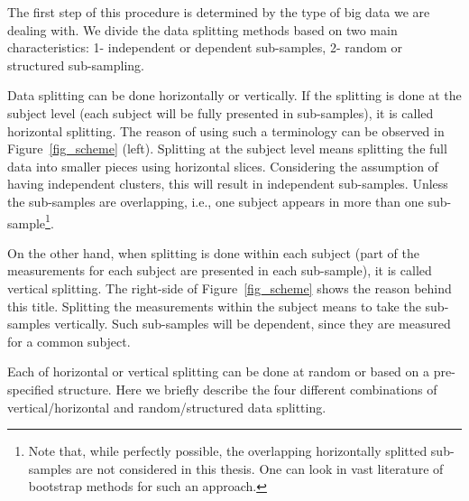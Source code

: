 \documentclass[14pt]{article}
\begin{document}
The first step of this procedure is determined by the type of big data we are dealing with. We divide the data splitting methods based on two main characteristics: 1- independent or dependent sub-samples, 2- random or structured sub-sampling.

Data splitting can be done horizontally or vertically. If the splitting is done at the subject level (each subject will be fully presented in sub-samples), it is called horizontal splitting. The reason of using such a terminology can be observed in Figure~\ref{fig_scheme} (left). Splitting at the subject level means splitting the full data into smaller pieces using horizontal slices. Considering the assumption of having independent clusters, this will result in independent sub-samples. Unless the sub-samples are overlapping, i.e., one subject appears in more than one sub-sample\footnote{Note that, while perfectly possible, the overlapping horizontally splitted sub-samples are not considered in this thesis. One can look in vast literature of bootstrap methods for such an approach.}.

On the other hand, when splitting is done within each subject (part of the measurements for each subject are presented in each sub-sample), it is called vertical splitting. The right-side of Figure~\ref{fig_scheme} shows the reason behind this title. Splitting the measurements within the subject means to take the sub-samples vertically. Such sub-samples will be dependent, since they are measured for a common subject.

Each of horizontal or vertical splitting can be done at random or based on a pre-specified structure.  Here we briefly describe the four different combinations of vertical/horizontal and random/structured data splitting.
\end{document}
